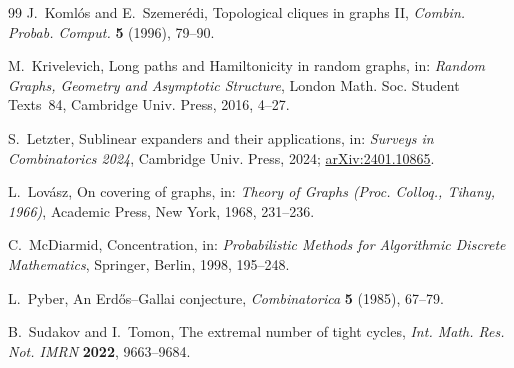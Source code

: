\documentclass[11pt]{article}
\theoremstyle{definition}
\theoremstyle{remark}
\numberwithin{equation}{section}
\numberwithin{figure}{section}
\numberwithin{table}{section}
\begin{document}
\begin{thebibliography}{99}
 J.~Koml\'os and E.~Szemer\'edi, Topological cliques in graphs
II, \emph{Combin. Probab. Comput.} \textbf{5} (1996), 79--90.

 M.~Krivelevich, Long paths and Hamiltonicity in random graphs,
in: \emph{Random Graphs, Geometry and Asymptotic Structure}, London Math. Soc.
Student Texts~84, Cambridge Univ. Press, 2016, 4--27.

 S.~Letzter, Sublinear expanders and their applications, in:
\emph{Surveys in Combinatorics 2024}, Cambridge Univ. Press, 2024;
\href{https://arxiv.org/abs/2401.10865}{arXiv:2401.10865}.

 L.~Lov\'asz, On covering of graphs, in: \emph{Theory of Graphs
(Proc. Colloq., Tihany, 1966)}, Academic Press, New York, 1968, 231--236.

 C.~McDiarmid, Concentration, in: \emph{Probabilistic Methods for
Algorithmic Discrete Mathematics}, Springer, Berlin, 1998, 195--248.

 L.~Pyber, An Erd\H{o}s--Gallai conjecture, \emph{Combinatorica}
\textbf{5} (1985), 67--79.

 B.~Sudakov and I.~Tomon, The extremal number of tight cycles,
\emph{Int. Math. Res. Not. IMRN} \textbf{2022}, 9663--9684.

\end{thebibliography}
\end{document}
